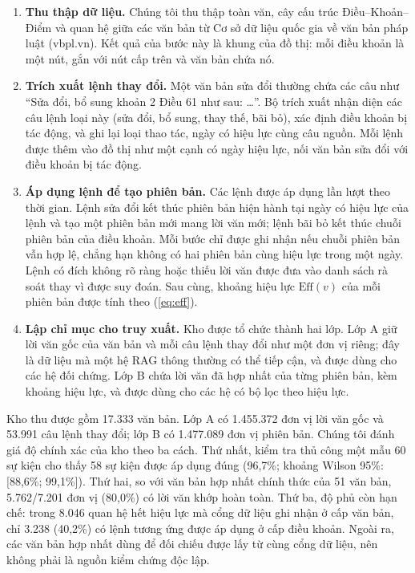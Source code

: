 \documentclass[11pt,a4paper]{article}
\begin{document}
\begin{enumerate}
  \item \textbf{Thu thập dữ liệu.} Chúng tôi thu thập toàn văn, cây cấu trúc Điều--Khoản--Điểm và quan hệ giữa các văn bản từ Cơ sở dữ liệu quốc gia về văn bản pháp luật (vbpl.vn). Kết quả của bước này là khung của đồ thị: mỗi điều khoản là một nút, gắn với nút cấp trên và văn bản chứa nó.
  \item \textbf{Trích xuất lệnh thay đổi.} Một văn bản sửa đổi thường chứa các câu như ``Sửa đổi, bổ sung khoản 2 Điều 61 như sau: \dots''. Bộ trích xuất nhận diện các câu lệnh loại này (sửa đổi, bổ sung, thay thế, bãi bỏ), xác định điều khoản bị tác động, và ghi lại loại thao tác, ngày có hiệu lực cùng câu nguồn. Mỗi lệnh được thêm vào đồ thị như một cạnh có ngày hiệu lực, nối văn bản sửa đổi với điều khoản bị tác động.
  \item \textbf{Áp dụng lệnh để tạo phiên bản.} Các lệnh được áp dụng lần lượt theo thời gian. Lệnh sửa đổi kết thúc phiên bản hiện hành tại ngày có hiệu lực của lệnh và tạo một phiên bản mới mang lời văn mới; lệnh bãi bỏ kết thúc chuỗi phiên bản của điều khoản. Mỗi bước chỉ được ghi nhận nếu chuỗi phiên bản vẫn hợp lệ, chẳng hạn không có hai phiên bản cùng hiệu lực trong một ngày. Lệnh có đích không rõ ràng hoặc thiếu lời văn được đưa vào danh sách rà soát thay vì được suy đoán. Sau cùng, khoảng hiệu lực $\mathrm{Eff}(v)$ của mỗi phiên bản được tính theo (\ref{eq:eff}).
  \item \textbf{Lập chỉ mục cho truy xuất.} Kho được tổ chức thành hai lớp. Lớp A giữ lời văn gốc của văn bản và mỗi câu lệnh thay đổi như một đơn vị riêng; đây là dữ liệu mà một hệ RAG thông thường có thể tiếp cận, và được dùng cho các hệ đối chứng. Lớp B chứa lời văn đã hợp nhất của từng phiên bản, kèm khoảng hiệu lực, và được dùng cho các hệ có bộ lọc theo hiệu lực.
\end{enumerate}

Kho thu được gồm 17.333 văn bản. Lớp A có 1.455.372 đơn vị lời văn gốc và 53.991 câu lệnh thay đổi; lớp B có 1.477.089 đơn vị phiên bản. Chúng tôi đánh giá độ chính xác của kho theo ba cách. Thứ nhất, kiểm tra thủ công một mẫu 60 sự kiện cho thấy 58 sự kiện được áp dụng đúng (96,7\%; khoảng Wilson 95\%: [88,6\%; 99,1\%]). Thứ hai, so với văn bản hợp nhất chính thức của 51 văn bản, 5.762/7.201 đơn vị (80,0\%) có lời văn khớp hoàn toàn. Thứ ba, độ phủ còn hạn chế: trong 8.046 quan hệ hết hiệu lực mà cổng dữ liệu ghi nhận ở cấp văn bản, chỉ 3.238 (40,2\%) có lệnh tương ứng được áp dụng ở cấp điều khoản. Ngoài ra, các văn bản hợp nhất dùng để đối chiếu được lấy từ cùng cổng dữ liệu, nên không phải là nguồn kiểm chứng độc lập.
\end{document}
